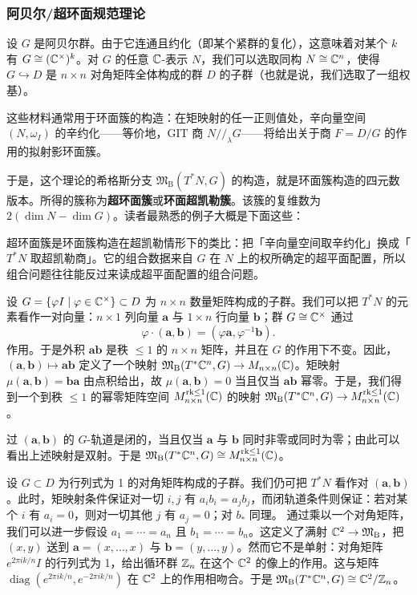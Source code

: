 \subsubsection{阿贝尔/超环面规范理论}


设 $G$ 是阿贝尔群。由于它连通且约化（即某个紧群的复化），这意味着对某个 $k$ 有 $G\cong (\mathbb{C}^{\times})^k$。对 $G$ 的任意 $\mathbb{C}$-表示 $N$，我们可以选取同构 $N\cong \mathbb{C}^n$，使得 $G\hookrightarrow D$ 是 $n\times n$ 对角矩阵全体构成的群 $D$ 的子群（也就是说，我们选取了一组权基）。

这些材料通常用于环面簇的构造：在矩映射的任一正则值处，辛向量空间 $(N,\omega_I)$ 的辛约化——等价地，GIT 商 $N/\!/_{\lambda}G$——将给出关于商 $F=D/G$ 的作用的拟射影环面簇。

于是，这个理论的希格斯分支 $\mathfrak{M}_{\operatorname{B}}(T^*N,G)$ 的构造，就是环面簇构造的四元数版本。所得的簇称为{\bf 超环面簇}或{\bf 环面超凯勒簇}。该簇的复维数为 $2(\dim N-\dim G)$。读者最熟悉的例子大概是下面这些：
\begin{yizhu}[超环面簇]
超环面簇是环面簇构造在超凯勒情形下的类比：把「辛向量空间取辛约化」换成「$T^*N$ 取超凯勒商」。它的组合数据来自 $G$ 在 $N$ 上的权所确定的超平面配置，所以组合问题往往能反过来读成超平面配置的组合问题。
\end{yizhu}
\begin{ex}\label{ex:TPn}
    设 $G=\{\varphi I \mid \varphi \in \mathbb{C}^{\times}\}\subset D$ 为 $n\times n$ 数量矩阵构成的子群。我们可以把 $T^*N$ 的元素看作一对向量：$n\times 1$ 列向量 $\mathbf{a}$ 与 $1\times n$ 行向量 $\mathbf{b}$；群 $G\cong \mathbb{C}^{\times}$ 通过
\[\varphi \cdot (\mathbf a,\mathbf b)=(\varphi\mathbf a,\varphi^{-1} \mathbf b) .\]
作用。于是外积 $\mathbf{ab}$ 是秩 $\leq 1$ 的 $n\times n$ 矩阵，并且在 $G$ 的作用下不变。因此，$(\mathbf a,\mathbf b)\mapsto \mathbf{ab}$ 定义了一个映射 $\mathfrak{M}_{\operatorname{B}}(T^*\mathbb{C}^n,G)\to M_{n\times n}(\mathbb{C})$。矩映射 $\mu(\mathbf a,\mathbf b)=\mathbf{ba}$ 由点积给出，故 $\mu(\mathbf a,\mathbf b)=0$ 当且仅当 $\mathbf{ab}$ 幂零。于是，我们得到一个到秩 $\leq 1$ 的幂零矩阵空间 $M_{n\times n}^{\mathrm{rk}\leq 1}(\mathbb{C})$ 的映射 $\mathfrak{M}_{\operatorname{B}}(T^*\mathbb{C}^n,G)\to M_{n\times n}^{\mathrm{rk}\leq 1}(\mathbb{C})$。

过 $(\mathbf a,\mathbf b)$ 的 $G$-轨道是闭的，当且仅当 $\mathbf a$ 与 $\mathbf b$ 同时非零或同时为零；由此可以看出上述映射是双射。于是 $\mathfrak{M}_{\operatorname{B}}( T^*\mathbb{C}^n,G) \cong  M_{n\times n}^{\mathrm{rk}\leq 1}(\mathbb{C})$。
\end{ex}
\begin{ex}\label{ex:CZn}
设 $G\subset D$ 为行列式为 1 的对角矩阵构成的子群。我们仍可把 $T^*N$ 看作对 $(\mathbf a,\mathbf b)$。此时，矩映射条件保证对一切 $i,j$ 有 $a_ib_i=a_jb_j$，而闭轨道条件则保证：若对某个 $i$ 有 $a_i=0$，则对一切其他 $j$ 有 $a_j=0$；对 $b_*$ 同理。
通过乘以一个对角矩阵，我们可以进一步假设 $a_1=\cdots =a_n$ 且 $b_1=\cdots =b_n$。这定义了满射 $\mathbb{C}^2 \to \mathfrak{M}_{\operatorname{B}}$，把 $(x,y)$ 送到 $\mathbf{a}=(x,\dots, x)$ 与 $\mathbf{b}=(y,\dots,y)$。然而它不是单射：对角矩阵 $e^{2\pi ik/n} I$ 的行列式为 1，给出循环群 $\mathbb{Z}_n$ 在这个 $\mathbb{C}^2$ 的像上的作用。这与矩阵 $\operatorname{diag}(e^{2\pi ik/n},e^{-2\pi ik/n})$ 在 $\mathbb{C}^2$ 上的作用相吻合。于是 $\mathfrak{M}_{\operatorname{B}}(T^*\mathbb{C}^n,G)\cong \mathbb{C}^2/\mathbb{Z}_{n}$。
\end{ex}

